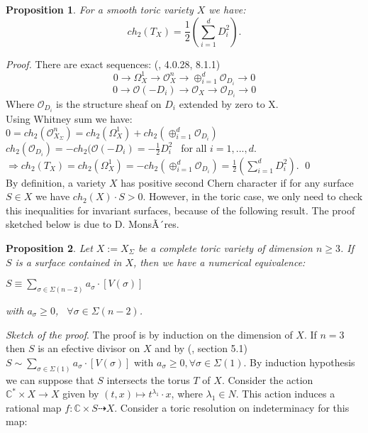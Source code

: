 \documentclass[10pt]{article}
\newtheorem{pr}{Proposition}[section]
\begin{document}
\begin{pr} For a smooth toric variety $X$ we have: $$ ch_2(T_X)=\frac{1}{2}\left(\displaystyle \sum_{i=1}^{d}D_i^2\right).$$ 
\end{pr}


\textit{Proof.} There are exact sequences: (\cite{cox}, 4.0.28, 8.1.1)\\
$$0\rightarrow\Omega_X^1\rightarrow \mathcal{O}_X^n\rightarrow \displaystyle \oplus_{i=1}^{d}\mathcal{O}_{D_i}\rightarrow0$$
$$0\rightarrow\mathcal{O}(-D_i)\rightarrow \mathcal{O}_X\rightarrow \mathcal{O}_{D_i}\rightarrow0$$ 
Where $\mathcal{O}_{D_i}$ is the structure sheaf on $D_i$ extended by zero to X.\\

Using Whitney sum we have:\\

$0=ch_2(\mathcal{O}_{X{_\Sigma}}^n)=ch_2(\Omega_X^1)+ch_2(\displaystyle \oplus_{i=1}^{d}\mathcal{O}_{D_i})$\\


$ch_2(\mathcal{O}_{D_i})=-ch_2(\mathcal{O}(-D_i)=-\frac{1}{2}D_i^2$ \ for all $i=1,...,d$.\\

$\Rightarrow ch_2(T_X)=ch_2(\Omega_X^1)=-ch_2(\displaystyle \oplus_{i=1}^{d}\mathcal{O}_{D_i})=\frac{1}{2}\left(\displaystyle \sum_{i=1}^{d}D_i^2\right)$. \qed\\
 
  
By definition, a variety $X$ has positive second Chern character if for any surface $S\in X$ we have $ch_2(X)\cdot S>0$. However, in the toric case, we only need to check this inequalities for invariant surfaces, because of the following result. The proof sketched below is due to D. MonsÃ´res.

\begin{pr}Let $X:= X_{\Sigma}$ be a complete toric variety of dimension $n \geq 3$. If $S$ is a surface
contained in $X$, then we have a numerical equivalence: 

\begin{center}     $S \equiv \displaystyle\sum_{\sigma \in \Sigma(n-2)} a_{\sigma} \cdot
[V(\sigma)]$

\end{center}

 \noindent with $a_{\sigma} \geq 0$, \  $\forall \sigma \in \Sigma(n-2)$.

\end{pr}

\textit{Sketch of the proof}. The proof is by induction on the dimension of $X$. If $n=3$ then $S$ is an efective divisor on $X$ and by (\cite{fulton}, section 5.1) $S\sim \displaystyle\sum_{\sigma\in \Sigma(1)}a_{\sigma}\cdot [V(\sigma)]$ with $a_{\sigma}\geq 0, \forall \sigma\in \Sigma(1).$ By induction hypothesis we can suppose that $S$ intersects the torus $T$ of $X$. Consider the action $\mathbb{C}^*\times X\rightarrow X$ given by $(t,x)\mapsto t^{\lambda_1}\cdot x$, where $\lambda_1\in N$. This action induces a rational map $f:\mathbb{C}\times S\dashrightarrow X$. Consider a toric resolution on indeterminacy for this map:\\
\end{document}

